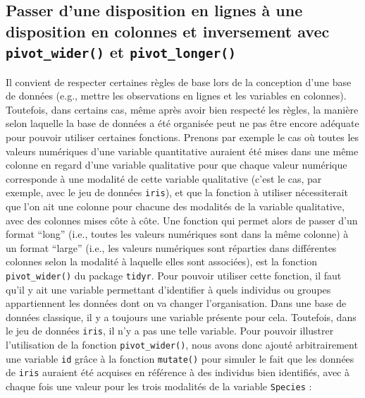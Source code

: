 \documentclass[
]{book}
\begin{document}
\hypertarget{passer-dune-disposition-en-lignes-uxe0-une-disposition-en-colonnes-et-inversement-avec-pivot_wider-et-pivot_longer}{%
\subsection{\texorpdfstring{Passer d'une disposition en lignes à une disposition en colonnes et inversement avec \texttt{pivot\_wider()} et \texttt{pivot\_longer()}}{Passer d'une disposition en lignes à une disposition en colonnes et inversement avec pivot\_wider() et pivot\_longer()}}\label{passer-dune-disposition-en-lignes-uxe0-une-disposition-en-colonnes-et-inversement-avec-pivot_wider-et-pivot_longer}}

Il convient de respecter certaines règles de base lors de la conception d'une base de données (e.g., mettre les observations en lignes et les variables en colonnes). Toutefois, dans certains cas, même après avoir bien respecté les règles, la manière selon laquelle la base de données a été organisée peut ne pas être encore adéquate pour pouvoir utiliser certaines fonctions. Prenons par exemple le cas où toutes les valeurs numériques d'une variable quantitative auraient été mises dans une même colonne en regard d'une variable qualitative pour que chaque valeur numérique corresponde à une modalité de cette variable qualitative (c'est le cas, par exemple, avec le jeu de données \texttt{iris}), et que la fonction à utiliser nécessiterait que l'on ait une colonne pour chacune des modalités de la variable qualitative, avec des colonnes mises côte à côte. Une fonction qui permet alors de passer d'un format ``long'' (i.e., toutes les valeurs numériques sont dans la même colonne) à un format ``large'' (i.e., les valeurs numériques sont réparties dans différentes colonnes selon la modalité à laquelle elles sont associées), est la fonction \texttt{pivot\_wider()} du package \texttt{tidyr}. Pour pouvoir utiliser cette fonction, il faut qu'il y ait une variable permettant d'identifier à quels individus ou groupes appartiennent les données dont on va changer l'organisation. Dans une base de données classique, il y a toujours une variable présente pour cela. Toutefois, dans le jeu de données \texttt{iris}, il n'y a pas une telle variable. Pour pouvoir illustrer l'utilisation de la fonction \texttt{pivot\_wider()}, nous avons donc ajouté arbitrairement une variable \texttt{id} grâce à la fonction \texttt{mutate()} pour simuler le fait que les données de \texttt{iris} auraient été acquises en référence à des individus bien identifiés, avec à chaque fois une valeur pour les trois modalités de la variable \texttt{Species} :
\end{document}
